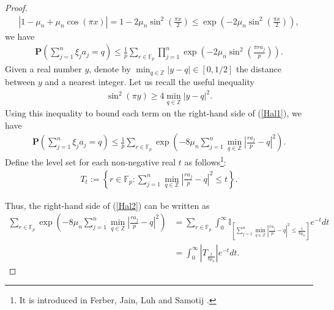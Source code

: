 \documentclass{article}
\numberwithin{equation}{section}
\theoremstyle{plain}
\begin{document}
\begin{proof}
\begin{align}
\left|1-\mu_{n}+\mu_{n}\cos(\pi x)\right|
=1-2\mu_{n}\sin^2(\frac {\pi x}2)
\le\exp\left(-2\mu_{n}\sin^2(\frac {\pi x}2)\right),
\end{align}
we have 
\begin{align}\label{Hal1}
  \textbf{P}\left(\sum_{j=1}^n\xi_ja_j=q\right)\le \frac1p\sum_{r\in\mathbb{F}_p}
    \prod_{j=1}^n\exp\left(-2\mu_{n}\sin^2(\frac {\pi ra_j}p)\right).
\end{align}
Given a real number $y$, denote by $\min_{q\in \mathbb{Z}}|y-q| \in[0,1 / 2]$ the distance between $y$ and a nearest integer. Let us recall the useful inequality
\begin{align*}
\sin^2\left(\pi y\right) \ge 4\min_{q\in \mathbb{Z}}|y-q|^2.
\end{align*}
Using this inequality to bound each term on the right-hand side of (\ref{Hal1}), we have
\begin{align}\label{Hal2}
  \textbf{P}\left(\sum_{j=1}^n\xi_ja_j=q\right)\le \frac1p\sum_{r\in\mathbb{F}_p}
   \exp\left(-8\mu_{n} \sum_{j=1}^n\min_{q\in \mathbb{Z}}|\frac { ra_j}p-q|^2\right).
\end{align}
Define the  level set for each non-negative real $t$ as follows\footnote {It is introduced in Ferber, Jain, Luh and Samotij \cite{MR4273471}.}:
\begin{align*}
T_t:=\left\{r \in \mathbb{F}_p: \sum_{j=1}^n\min_{q\in \mathbb{Z}}|\frac { ra_j}p-q|^2 \leqslant t\right\}.
\end{align*}

Thus, the right-hand side of (\ref{Hal2}) can be written as
\begin{align}\label{Hal3}
\sum_{r \in \mathbb{F}_p} \exp \left(-8\mu_{n} \sum_{j=1}^n\min_{q\in \mathbb{Z}}|\frac { ra_j}p-q|^2\right)&=\sum_{r \in \mathbb{F}_p} \int_0^{\infty} \mathbb{I}_{\left[\sum_{j=1}^n\min_{q\in \mathbb{Z}}|\frac { ra_j}p-q|^2 \leqslant \frac{t}{8\mu_{n}}\right]} e^{-t}dt\\
&=\int_0^{\infty}\left|T_{\frac{t}{8\mu_{n}}}\right| e^{-t} dt.
\end{align}


\end{proof}
\end{document}
